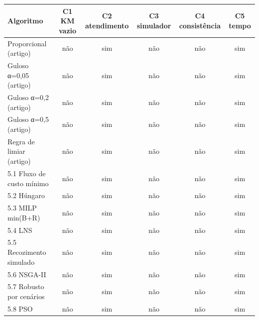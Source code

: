 \begin{tabular}{lccccc}
\hline
Algoritmo & C1 KM vazio & C2 atendimento & C3 simulador & C4 consistência & C5 tempo \\
\hline
Proporcional (artigo) & não & sim & não & não & sim \\
Guloso α=0,05 (artigo) & não & sim & não & não & sim \\
Guloso α=0,2 (artigo) & não & sim & não & não & sim \\
Guloso α=0,5 (artigo) & não & sim & não & não & sim \\
Regra de limiar (artigo) & não & sim & não & não & sim \\
5.1 Fluxo de custo mínimo & não & sim & não & não & sim \\
5.2 Húngaro & não & sim & não & não & sim \\
5.3 MILP min(B+R) & não & sim & não & não & sim \\
5.4 LNS & não & sim & não & não & sim \\
5.5 Recozimento simulado & não & sim & não & não & sim \\
5.6 NSGA-II & não & sim & não & não & sim \\
5.7 Robusto por cenários & não & sim & não & não & sim \\
5.8 PSO & não & sim & não & não & sim \\
\hline
\end{tabular}
